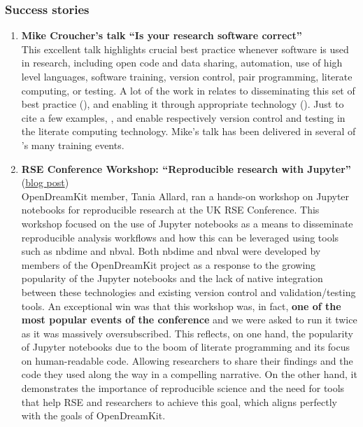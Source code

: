 \subsubsection{Success stories}

\begin{enumerate}
\item \textbf{Mike Croucher's talk ``Is your research software correct''}\\
  This excellent talk highlights crucial best practice whenever
  software is used in research, including open code and data sharing,
  automation, use of high level languages, software training, version
  control, pair programming, literate computing, or testing. A lot of
  the work in \ODK relates to disseminating this set of best practice
  (), and enabling it through appropriate technology
  (). Just to cite a few examples,
  , and
   enable respectively version control
  and testing in the \Jupyter literate computing technology.
  Mike's talk has been delivered in several of \ODK's many
  training events.

\item \textbf{RSE Conference Workshop: ``Reproducible research with Jupyter''}
  (\href{https://opendreamkit.org/2018/03/07/opendreamkit-at-the-rse-conference/}{blog post})\\
  OpenDreamKit member, Tania Allard, ran a hands-on workshop on
  Jupyter notebooks for reproducible research at the UK RSE
  Conference. This workshop focused on the use of Jupyter notebooks as
  a means to disseminate reproducible analysis workflows and how this
  can be leveraged using tools such as nbdime and nbval. Both nbdime
  and nbval were developed by members of the OpenDreamKit project as a
  response to the growing popularity of the Jupyter notebooks and the
  lack of native integration between these technologies and existing
  version control and validation/testing tools. An exceptional win was
  that this workshop was, in fact, \textbf{one of the most popular events of
  the conference} and we were asked to run it twice as it was massively
  oversubscribed. This reflects, on one hand, the popularity of
  Jupyter notebooks due to the boom of literate programming and its
  focus on human-readable code. Allowing researchers to share their
  findings and the code they used along the way in a compelling
  narrative. On the other hand, it demonstrates the importance of
  reproducible science and the need for tools that help RSE and
  researchers to achieve this goal, which aligns perfectly with the
  goals of OpenDreamKit.


\end{enumerate}

